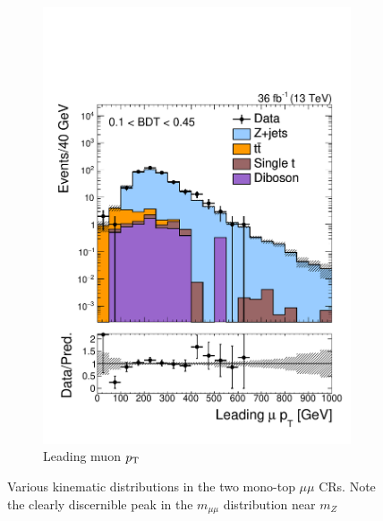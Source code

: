 \begin{figure}[]
\begin{center}
\begin{subfigure}[t]{0.49\textwidth}
            \includegraphics[width=\textwidth]{figures/monotop/prefit/dimuon_loose_looseLep1Pt_logy.pdf}
            \caption{Leading muon $p_\mathrm{T}$}
        \end{subfigure}
        \caption{Various kinematic distributions in the two mono-top $\mu\mu$ CRs.
                Note the clearly discernible peak in the $m_{\mu\mu}$ distribution near $m_Z$}
        \label{fig:mt:prefit_dimuon}
    \end{center}
\end{figure}

